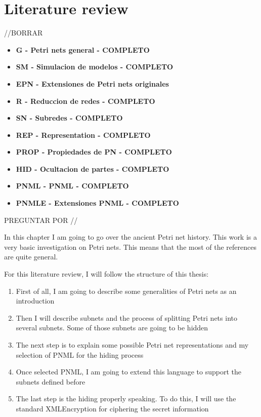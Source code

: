 
\chapter{Literature review} %

\label{Chapter: LiteratureReview} %


//BORRAR

\begin{itemize}
 \item \textbf{G - Petri nets general - COMPLETO}
 \item \textbf{SM - Simulacion de modelos
- COMPLETO} \item \textbf{EPN - Extensiones de Petri nets originales
} \item \textbf{R - Reduccion de redes
- COMPLETO} \item \textbf{SN - Subredes
- COMPLETO }\item \textbf{REP - Representation - COMPLETO}
 \item \textbf{PROP - Propiedades de PN - COMPLETO}
 \item \textbf{HID - Ocultacion de partes
- COMPLETO} \item \textbf{PNML - PNML
- COMPLETO }\item \textbf{PNMLE - Extensiones PNML
- COMPLETO}
\end{itemize}


PREGUNTAR POR \cite{EPN-Campos1992352}
\cite{EPN-SM-Latorre2010152}
//

In this chapter I am going to go over the ancient Petri net history. 
This work is a very basic investigation 
on Petri nets. This means that the most of the references are quite general.

For this literature review, I will follow the structure of this thesis:

\begin{enumerate}
\item First of all, I am going to describe some generalities of Petri nets
as an introduction
\item Then I will describe subnets and the process of splitting Petri nets
into several subnets. Some of those subnets are going to be hidden 
\item The next step is to explain some possible Petri net representations
and my selection of PNML for the hiding process
\item Once selected PNML, I am going to extend this language to support the
subnets defined before
\item The last step is the hiding properly speaking. To do this, I will use the standard XMLEncryption for ciphering the secret information
\end{enumerate}

